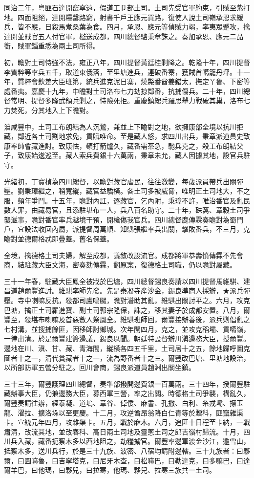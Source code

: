 \begin{pinyinscope}
同治二年，粵匪石達開竄寧遠，假道工⼙部土司。土司先受官軍約束，引賊至紫打地。四面阻絕，達開糧罄路窮，射書千戶王應元買路，復使人說土司嶺承恩求緩兵，皆不應，日殺馬煮桑葉為食。四月，承恩、應元等偵賊力竭，率夷眾蹙攻，擒達開並賊官五人付官軍，檻送成都，四川總督駱秉章誅之。奏加承恩、應元二品銜，賊軍錙重悉為兩土司所得。

初，瞻對土司恃強不法，雍正八年，四川提督黃廷桂剿降之。乾隆十年，四川提督李質粹等率兵五千，取道東俄落，至里塘進兵，連破番寨，獲賊首噶籠丹坪。十一年，質粹會欽差大臣班第，統兵進克泥日寨，燒斃番酋姜錯太，撫定丫魯、下密等處番夷。嘉慶十九年，中瞻對土司洛布七力劫掠鄰番，抗捕傷兵。二十年，四川總督常明、提督多隆武領兵剿之，恃險死拒。重慶鎮總兵羅思舉力戰破其巢，洛布七力焚死，分其地入上下瞻對。

洎咸豐中，土司工布朗結為人沉鷙，兼並上下瞻對之地，欲擁康部全境以抗川拒藏，鄰近各土司割地求免，貢賦唯命。至是藏人怒，求四川出兵，秉章派道員史致康率師會藏進討。致康怯，頓打箭爐久，藏番需茶急，馳兵克之，殺工布朗結父子，致康始逡巡至。藏人索兵費銀十六萬兩，秉章未允，藏人因據其地，設官兵駐守。

光緒初，丁寶楨為四川總督，以瞻對藏官虐民，往往激變，每歲派員帶兵出關彈壓。劉秉璋繼之，稍寬縱，藏官益驕橫。各土司多被威脅，唯明正土司地大，不之服，頻年爭鬥。十五年，瞻對內訌，逐藏官，乞內附，秉璋不許，唯治番官及亂民數人罪，由藏易官，且添駐堪布一人，兵八百名助守。二十年，硃窩、章穀土司爭襲滋事，瞻對番官率兵越境干預，開槍傷我官兵。四川總督鹿傳霖奏瞻對為蜀門戶，宜設法收回內屬，派提督周萬順、知縣張繼率兵出關，擊敗番兵，不三月，克瞻對並德爾格忒即疊蓋。舊名保蓋。

全境，擒德格土司夫婦，解至成都，議敘改設流官。成都將軍恭壽憤傳霖不先會商，結駐藏大臣文海，密奏劾傳霖，翻原案，復德格土司職，仍以瞻對屬藏。

三十一年春，駐藏大臣鳳全被戕於巴塘，四川總督錫良奏請以四川提督馬維騏、建昌道趙爾豐進討。維騏率師先發。先是泰凝寺產沙金，錫良準商人採辦，★派兵彈壓。寺中喇嘛反抗，殺都司盧鳴颺，瞻對潛助其亂，維騏出關討平之。六月，攻克巴塘，擒正土司羅進寶、副土司郭宗隆保，誅之，移其妻子於成都安置。八月，爾豐至，殺堪布喇嘛及首惡數人祭鳳全。維騏班師回，爾豐接辦善後，派兵剿倡亂之七村溝，並搜捕餘匪，因移師討鄉城。次年閏四月，克之，並攻克稻壩、貢噶嶺，一律肅清。於是爾豐建籌邊議，錫良以聞。朝廷特設督辦川滇邊務大臣，授爾豐。邊地在川、滇、甘、藏、青海間，縱橫各四五千里，土司居十之五，餘地歸呼圖克圖者十之一，清代賞藏者十之一，流為野番者十之三。爾豐改巴塘、里塘地設治，以所部防軍五營分駐之。回川會商，錫良派道員趙淵出關坐鎮。

三十三年，爾豐護理四川總督，奏準部撥開邊費銀一百萬兩。三十四年，授爾豐駐藏辦事大臣，仍兼邊務大臣，募西軍三營，率之出關。時德格土司爭襲，構亂久，爾豐奏請往辦，經泰凝、道塢、章谷、倬倭、麻書、孔撒、白利、糸戎壩、擦玉龍、濯拉、擴洛垛以至更慶。十二月，攻逆酋昂翁降白仁青等於贈科，匪竄雜渠卡。宣統元年四月，攻雜渠卡。五月，戰於麻木。六月，追匪十日程至卡納，一戰肅清，改流其地，並改春科、高日兩土司地及靈蔥土司之郎吉嶺村歸流。十月，四川兵入藏，藏番扼察木多以西地阻之，劫糧擄官。爾豐率邊軍渡金沙江，逾雪山，抵察木多，送川兵行，於是三十九族、波密、八宿均請附邊轄。三十九族者：曰夥爾，曰圖嘛魯，曰吉寧塔克，曰尼牙木查，曰松嘛巴，曰勒達克，曰多嘛巴，曰達爾羊巴，曰他瑪，曰夥兒，曰拉寒，他瑪、夥兒、拉寒三族共一土司。


\end{pinyinscope}
